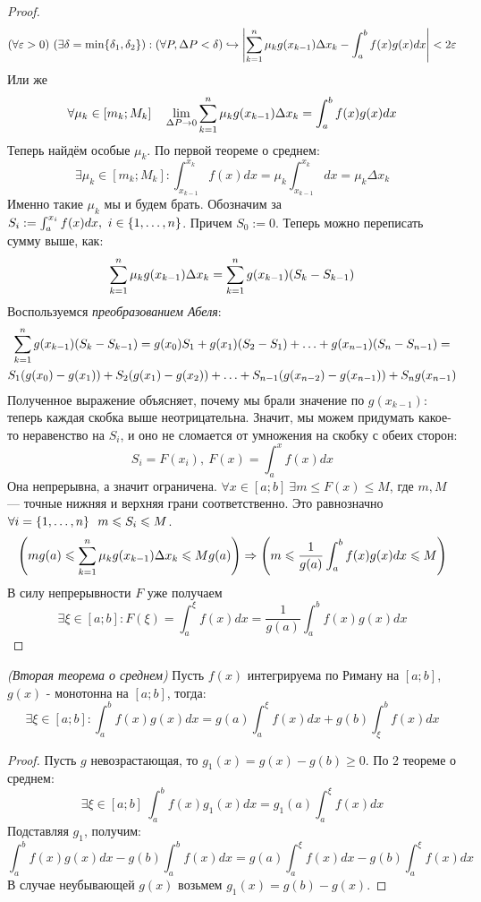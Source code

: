 \begin{proof}
	\[
		(\forall \eps > 0)\ (\exists \delta = \min \{\delta_1, \delta_2\}) : (\forall P, \Delta P < \delta) \hookrightarrow \left|\suml_{k = 1}^n\mu_kg(x_{k - 1}) \Delta x_k - \int_a^bf(x)g(x)dx\right| < 2\eps
	\]
	Или же
	\[
		\forall \mu_k \in [m_k; M_k] \quad \lim\limits_{\Delta P \to 0} \sum\limits_{k = 1}^n\mu_kg(x_{k - 1})\Delta x_k = \int_a^bf(x)g(x)dx
	\]
	Теперь найдём особые $\mu_k$. По первой теореме о среднем:
	\[
		\exists \mu_k \in [m_k; M_k] : \int_{x_{k - 1}}^{x_k} f(x)dx = \mu_k \int_{x_{k - 1}}^{x_k} dx = \mu_k\Delta x_k
	\]
	Именно такие $\mu_k$ мы и будем брать. Обозначим за $S_i := \int_a^{x_i}f(x)dx,\ i \in \{1, \ldots, n\}$. Причем $S_0 := 0$. Теперь можно переписать сумму выше, как:
	\[
		\sum\limits_{k = 1}^n\mu_kg(x_{k - 1})\Delta x_k = \sum\limits_{k = 1}^ng(x_{k - 1})(S_k - S_{k - 1})
	\]
	Воспользуемся \textit{преобразованием Абеля}:
	\begin{multline*}
		\sum\limits_{k = 1}^ng(x_{k - 1})(S_k - S_{k - 1}) = g(x_0)S_1 +g(x_1)(S_2 - S_1) + \ldots + g(x_{n - 1})(S_n - S_{n - 1}) =
		\\
		 S_1(g(x_0) - g(x_1)) + S_2(g(x_1) - g(x_2)) + \ldots + S_{n - 1}(g(x_{n - 2}) - g(x_{n - 1})) + S_ng(x_{n - 1})
	\end{multline*}
	Полученное выражение объясняет, почему мы брали значение по $g(x_{k - 1})$: теперь каждая скобка выше неотрицательна. Значит, мы можем придумать какое-то неравенство на $S_i$, и оно не сломается от умножения на скобку с обеих сторон:
	\[
		S_i = F(x_i),\ F(x) = \int_a^xf(x)dx
	\]
	Она непрерывна, а значит ограничена. $\forall x \in [a;b]\ \exists m \leq F(x) \leq M$, где $m, M$ --- точные нижняя и верхняя грани соответственно. Это равнозначно $\forall i = \{1, \ldots, n\}\ \ m \leqslant S_i \leqslant M$.
	\[
		\left(mg(a) \leqslant \sum\limits_{k = 1}^n \mu_k g(x_{k - 1})\Delta x_k \leqslant Mg(a)\right) \Rightarrow \left(m \leqslant \frac{1}{g(a)} \int_a^b f(x)g(x)dx \leqslant M\right)
	\]
	В силу непрерывности $F$ уже получаем
	\[
		\exists \xi \in [a;b] : F(\xi) = \int_a^\xi f(x)dx =  \frac{1}{g(a)}\int_a^bf(x)g(x)dx
	\]
\end{proof}


\begin{theorem} \textit{(Вторая теорема о среднем)}
	Пусть $f(x)$  интегрируема по Риману на $[a;b]$, $g(x)$ - монотонна на $[a;b]$, тогда:
	\[
		\exists \xi \in [a;b] : \int_a^b f(x)g(x)dx = g(a)\int_a^\xi f(x)dx + g(b)\int_\xi^b f(x)dx
	\]
\end{theorem}

\begin{proof}
	Пусть $g$  невозрастающая, то $g_1(x) = g(x) - g(b) \geq 0$. По 2 теореме о среднем:
	\[
		\exists \xi \in [a;b]\ \int_a^bf(x)g_1(x)dx = g_1(a)\int_a^\xi f(x)dx
	\]
	Подставляя $g_1$, получим:
	\[
		\int_a^bf(x)g(x)dx - g(b) \int_a^bf(x)dx = g(a)\int_a^\xi f(x)dx - g(b)\int_a^\xi f(x)dx
	\]
	В случае неубывающей $g(x)$ возьмем $g_1(x) = g(b) - g(x)$.
\end{proof}

